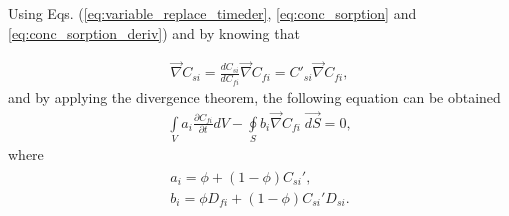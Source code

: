 \documentclass[a4paper,14pt,english]{extreport}
\begin{document}
 Using Eqs. (\ref{eq:variable_replace_timeder}, \ref{eq:conc_sorption} and \ref{eq:conc_sorption_deriv}) and by knowing that
 
  \begin{eqnarray}
 \label{eq:variable_replace}
\vec\nabla C_{si} =  \frac{dC_{si}}{dC_{fi}}\vec\nabla C_{fi} = C'_{si}\vec\nabla C_{fi},
 \end{eqnarray}
and by applying the divergence theorem, the following equation can be obtained
  \begin{eqnarray}
 \label{eq:diffusuin_multicomp_integral}
 \int \limits_{V} a_{i} \frac{\partial C_{fi}}{\partial t} d V - \oint \limits_{S} b_{i} \vec{\nabla}C_{fi} \; \vec{dS} = 0,
 \end{eqnarray}
where  
 \begin{eqnarray}
 \begin{gathered}
 \label{eq:alpha}
 a_{i}  =  \phi + \left(1-\phi \right)C_{si}', \\ 
 b_{i}  = \phi D_{fi} + \left(1-\phi \right) C_{si}'D_{si}.
 \end{gathered}
 \end{eqnarray}

 
\end{document}

